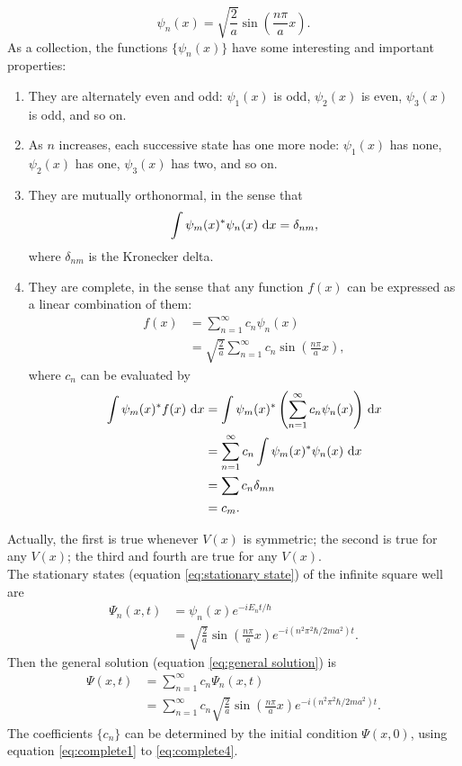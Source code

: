 \documentclass[en, oneside]{vivi}
\begin{document}
\begin{equation}
    \psi_n(x) = \sqrt{\frac{2}{a}} \sin \left(\frac{n\pi}{a} x\right).
\end{equation}
As a collection, the functions $\{ \psi_n(x) \}$ have some interesting and important properties:
\begin{enumerate}
    \item They are alternately even and odd: $\psi_1(x)$ is odd, $\psi_2(x)$ is even, $\psi_3(x)$ is odd, and so on.
    \item As $n$ increases, each successive state has one more node: $\psi_1(x)$ has none, $\psi_2(x)$ has one, $\psi_3(x)$ has two, and so on.
    \item They are mutually orthonormal, in the sense that
    \begin{equation}
        \int \psi_m(x)^* \psi_n(x) \dif x = \delta_{nm},
    \end{equation}
    where $\delta_{nm}$ is the Kronecker delta.
    \item They are complete, in the sense that any function $f(x)$ can be expressed as a linear combination of them:
    \begin{align}
        f(x) &= \sum_{n=1}^\infty c_n \psi_n(x)\\
        &= \sqrt{\frac{2}{a}} \sum_{n=1}^\infty c_n \sin \left(\frac{n\pi}{a} x\right),
    \end{align}
    where $c_n$ can be evaluated by
    \begin{align} 
        \int \psi_m(x)^* f(x) \dif x &= \int \psi_m(x)^* \left(\sum_{n=1}^\infty c_n \psi_n(x)\right) \dif x\label{eq:complete1}\\
        &= \sum_{n=1}^\infty c_n \int \psi_m(x)^* \psi_n(x) \dif x\\
        &= \sum c_n \delta_{mn}\\
        &= c_m\label{eq:complete4}.
    \end{align}
\end{enumerate}
Actually, the first is true whenever $V(x)$ is symmetric; the second is true for any $V(x)$; the third and fourth are true for any $V(x)$.\\
The stationary states (equation \eqref{eq:stationary state}) of the infinite square well are
\begin{align}
    \Psi_n(x, t) &= \psi_n(x) e^{-iE_nt/\hbar}\\
    &= \sqrt{\frac{2}{a}} \sin \left(\frac{n\pi}{a} x\right) e^{-i(n^2 \pi^2 \hbar/2ma^2)t}.
\end{align}
Then the general solution (equation \eqref{eq:general solution}) is
\begin{align}
    \Psi(x, t) &= \sum_{n=1}^\infty c_n \Psi_n(x, t)\\
    &= \sum_{n=1}^\infty c_n \sqrt{\frac{2}{a}} \sin \left(\frac{n\pi}{a} x\right) e^{-i(n^2 \pi^2 \hbar/2ma^2)t}.
\end{align}
The coefficients $\{ c_n \}$ can be determined by the initial condition $\Psi(x, 0)$, using equation \eqref{eq:complete1} to \eqref{eq:complete4}.
\end{document}
